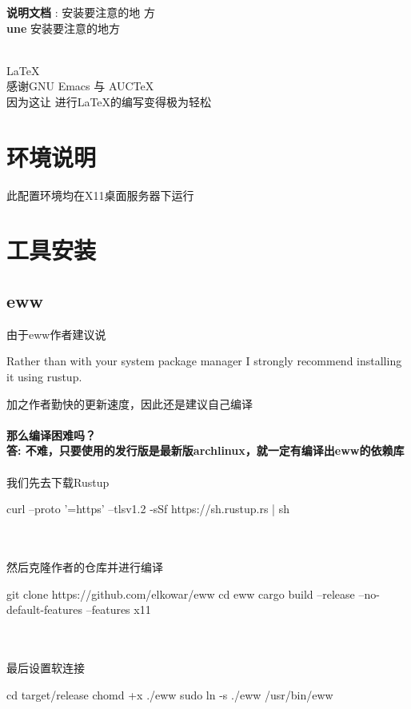\documentclass[11pt]{article}
\date{\today}
\title{}
\begin{document}
\begin{titlepage}
  \begin{center}
    \vspace*{1cm} \textbf{说明文档} \vspace{0.5cm} : 安装要注意的地
    方\vspace{1.5cm} \\ \textbf{une} \vfill 安装要注意的地方\vspace{0.8cm} \\
    \date{\today} \\ \LaTeX \\ \vspace{0.6cm} 感谢GNU Emacs 与 AUCTeX \\ 因为这让
    进行\LaTeX{}的编写变得极为轻松
  \end{center}
\end{titlepage}

\tableofcontents

\newpage{}
\section{环境说明}
此配置环境均在X11桌面服务器下运行
\section{工具安装}
\subsection{eww}
由于eww作者建议说
\begin{code}
  Rather than with your system package manager
  I strongly recommend installing it using rustup.
\end{code}
加之作者勤快的更新速度，因此还是建议自己编译
\\ \\
\textbf{那么编译困难吗？} \\
\textbf{答: 不难，只要使用的发行版是最新版archlinux，就一定有编译出eww的依赖库}
\\ \\
我们先去下载Rustup
\begin{code}
  curl --proto '=https' --tlsv1.2 -sSf https://sh.rustup.rs | sh
\end{code}
\\ \\ 
然后克隆作者的仓库并进行编译
\begin{code}
  git clone https://github.com/elkowar/eww cd eww
  cargo build --release --no-default-features --features x11
\end{code}
\\ \\ 
最后设置软连接
\begin{code}
  cd target/release
  chomd +x ./eww
  sudo ln -s ./eww /usr/bin/eww
\end{code}
\\ \\

\newpage{}
\end{document}
